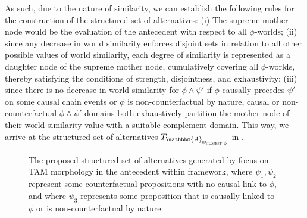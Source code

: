 As such, due to the nature of similarity, we can establish the following rules for the construction of the structured set of alternatives: (i) The supreme mother node would be the evaluation of the antecedent with respect to all $\phi$-worlds; (ii) since any decrease in world similarity enforces disjoint sets in relation to all other possible values of world similarity, each degree of similarity is represented as a daughter node of the supreme mother node, cumulatively covering all $\phi$-worlds, thereby satisfying the conditions of strength, disjointness, and exhaustivity; (iii) since there is no decrease in world similarity for $\phi\land\psi'$ if $\phi$ causally precedes $\psi'$ on some causal chain events or $\phi$ is non-counterfactual by nature, causal or non-counterfactual $\phi\land\psi'$ domains both exhaustively partition the mother node of their world similarity value with a suitable complement domain. This way, we arrive at the structured set of alternatives $T_{\mathbbm{A}_\text{{\scshape id\textsubscript{closest-$\phi$}}}}$ in .
\begin{figure}[!htb]
    \centering
    \resizebox{\textwidth}{!}{}
    \caption{The proposed structured set of alternatives generated by focus on TAM morphology in the antecedent within  framework, where $\psi_1,\psi_2$ represent some counterfactual propositions with no causal link to $\phi$, and where $\psi_3$ represents some proposition that is causally linked to $\phi$ or is non-counterfactual by nature.}
\end{figure}

